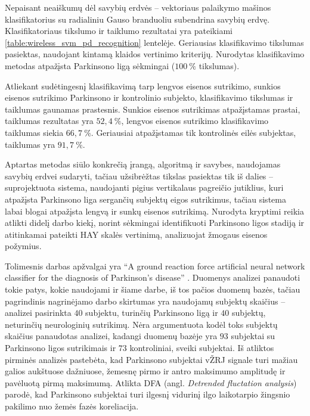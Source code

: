 \documentclass[]{vgtuef}
\begin{document}
Nepaisant neaiškumų dėl savybių erdvės -- vektoriaus palaikymo mašinos klasifikatorius su radialiniu Gauso branduoliu subendrina savybių erdvę. Klasifikatoriaus tikslumo ir taiklumo rezultatai yra pateikiami \ref{table:wireless_svm_pd_recognition} lentelėje. Geriausias klasifikavimo tikslumas pasiektas, naudojant kintamą klaidos vertinimo kriterijų. Nurodytas klasifikavimo metodas atpažįsta Parkinsono ligą sėkmingai ($100~\%$ tikslumas).

Atliekant sudėtingesnį klasifikavimą tarp lengvos eisenos sutrikimo, sunkios eisenos sutrikimo Parkinsono ir kontrolinio subjekto, klasifikavimo tikslumas ir taiklumas gaunamas prastesnis. Sunkios eisenos sutrikimas atpažįstamas prastai, taiklumas rezultatas yra $52,4~\%$, lengvos eisenos sutrikimo klasifikavimo taiklumas siekia $66,7~\%$. Geriausiai atpažįstamas tik kontrolinės eilės subjektas, taiklumas yra $91,7~\%$.

Aptartas metodas siūlo konkrečią įrangą, algoritmą ir savybes, naudojamas savybių erdvei sudaryti, tačiau užsibrėžtas tikslas pasiektas tik iš dalies -- suprojektuota sistema, naudojanti pigius vertikalaus pagreičio jutiklius, kuri atpažįsta Parkinsono liga sergančių subjektų eigos sutrikimus, tačiau sistema labai blogai atpažįsta lengvą ir sunkų eisenos sutrikimą. Nurodyta kryptimi reikia atlikti didelį darbo kiekį, norint sėkmingai identifikuoti Parkinsono ligos stadiją ir atitinkamai pateikti HAY skalės vertinimą, analizuojat žmogaus eisenos požymius.


Tolimesnis darbas apžvalgai yra ``A ground reaction force artificial neural network classifier for the diagnosis of Parkinson's disease'' \cite{vgtu}. Duomenys analizei panaudoti tokie patys, kokie naudojami ir šiame darbe, iš tos pačios duomenų bazės, tačiau pagrindinis nagrinėjamo darbo skirtumas yra naudojamų subjektų skaičius -- analizei pasirinkta $40$ subjektu, turinčių Parkinsono ligą ir $40$ subjektų, neturinčių neurologinių sutrikimų. Nėra argumentuota kodėl toks subjektų skaičius panaudotas analizei, kadangi duomenų bazėje yra $93$ subjektai su Parkinsono ligos sutrikimais ir $73$ kontroliniai, sveiki subjektai. Iš atliktos pirminės analizės pastebėta, kad Parkinsono subjektai vŽRJ signale turi mažiau galios aukštuose dažniuose, žemesnę pirmo ir antro maksimumo amplitudę ir pavėluotą pirmą maksimumą. Atlikta DFA (angl. \textit{Detrended fluctation analysis}) parodė, kad Parkinsono subjektai turi ilgesnį vidurinį ilgo laikotarpio žingsnio pakilimo nuo žemės fazės koreliacija.
\end{document}
